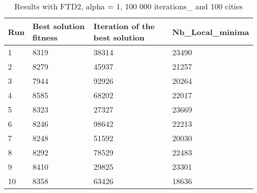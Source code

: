 \documentclass[12pt,oneside,a4paper]{article}
\begin{document}
\begin{table}[h]
  \centering
  \small
  \begin{tabular}{llll}
    \hline
    \multicolumn{1}{|l|}{\textbf{Run}}& \multicolumn{1}{l|}{\textbf{Best solution fitness}}& \multicolumn{1}{l|}{\textbf{Iteration of the best solution}}& \multicolumn{1}{l|}{\textbf{Nb\_Local\_minima}}\\ \hline
    \multicolumn{1}{|l|}{1} & \multicolumn{1}{l|}{8319}  & \multicolumn{1}{l|}{38314} & \multicolumn{1}{l|}{23490}  \\ \hline
    \multicolumn{1}{|l|}{2} & \multicolumn{1}{l|}{8279}  & \multicolumn{1}{l|}{45937} & \multicolumn{1}{l|}{21257}  \\ \hline
    \multicolumn{1}{|l|}{3} & \multicolumn{1}{l|}{7944}  & \multicolumn{1}{l|}{92926}  & \multicolumn{1}{l|}{20264}  \\ \hline
    \multicolumn{1}{|l|}{4} & \multicolumn{1}{l|}{8585}  & \multicolumn{1}{l|}{68202}  & \multicolumn{1}{l|}{22017}  \\ \hline
    \multicolumn{1}{|l|}{5} & \multicolumn{1}{l|}{8323}  & \multicolumn{1}{l|}{27327}  & \multicolumn{1}{l|}{23669}  \\ \hline
    \multicolumn{1}{|l|}{6} & \multicolumn{1}{l|}{8246}  & \multicolumn{1}{l|}{98642}  & \multicolumn{1}{l|}{22213}  \\ \hline
    \multicolumn{1}{|l|}{7} & \multicolumn{1}{l|}{8248}  & \multicolumn{1}{l|}{51592}  & \multicolumn{1}{l|}{20030}  \\ \hline
    \multicolumn{1}{|l|}{8} & \multicolumn{1}{l|}{8292}  & \multicolumn{1}{l|}{78529} & \multicolumn{1}{l|}{22483}  \\ \hline
    \multicolumn{1}{|l|}{9} & \multicolumn{1}{l|}{8410}  & \multicolumn{1}{l|}{29825} & \multicolumn{1}{l|}{23301}  \\ \hline
    \multicolumn{1}{|l|}{10} & \multicolumn{1}{l|}{8358}  & \multicolumn{1}{l|}{63426} & \multicolumn{1}{l|}{18636}  \\ \hline
  \end{tabular}
  \caption{Results with FTD2, alpha = 1, 100 000 iterations\_ and 100 cities}
\end{table}
\end{document}
